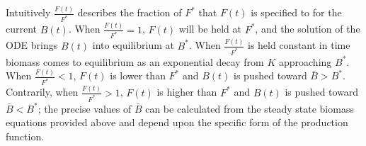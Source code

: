 %
Intuitively $\frac{F(t)}{F^*}$ describes the fraction of $F^*$ that $F(t)$ is
specified to for the current $B(t)$. When $\frac{F(t)}{F^*}=1$, $F(t)$ will be
held at $F^*$, and the solution of the ODE brings $B(t)$ into equilibrium at
$B^*$. When $\frac{F(t)}{F^*}$ is held constant in time biomass %
comes to equilibrium as an exponential decay from $K$ approaching $B^*$.
When $\frac{F(t)}{F^*}<1$, $F(t)$ is lower than $F^*$ and $B(t)$ is pushed
toward $\bar B>B^*$. Contrarily, when $\frac{F(t)}{F^*}>1$, $F(t)$ is higher
than $F^*$ and $B(t)$ is pushed toward $\bar B<B^*$; the precise values of
$\bar B$ can be calculated from the steady state biomass equations provided
above and depend upon the specific form of the production function. %

